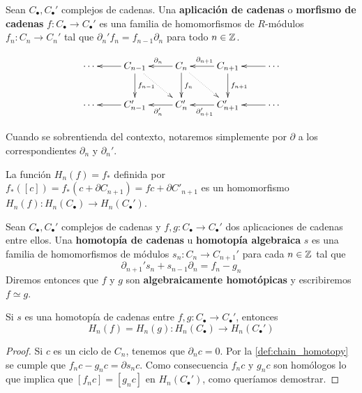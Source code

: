 \begin{definicion}
	Sean \(C_{\bullet},C_{\bullet}'\) complejos de cadenas. Una \textbf{aplicación
	de cadenas} o \textbf{morfismo de cadenas}
	\(f: C_{\bullet}\rightarrow C_{\bullet}'\) es una familia de homomorfismos de
	\(R\)-módulos \(f_{n}: C_{n} \rightarrow C_{n}'\) tal que
	\(\partial_{n}'f_{n} = f_{n-1}\partial_{n}\) para todo \(n \in \mathbb{Z}\).
\end{definicion}

\begin{equation}
	\label{chaincomplex}\xymatrix{ \cdots & C_{n-1} \ar[l] \ar[d]^{f_{n-1}} \ar@{..>}[dr] & C_n \ar[l]_{\partial_{n}} \ar[d]^{f_n} \ar@{..>}[dr] & C_{n+1} \ar[l]_{\partial_{n+1}} \ar[d]^{f_{n+1}} & \cdots \ar[l] \\ \cdots & C'_{n-1} \ar[l] & C'_n \ar[l]^{\partial'_{n}} & C'_{n+1} \ar[l]^{\partial'_{n+1}} & \cdots \ar[l] }
\end{equation}

Cuando se sobrentienda del contexto, notaremos simplemente por \(\partial\) a los
correspondientes \(\partial_{n}\) y \(\partial_{n}'\).

La función \(H_{n}(f) = f_{*}\) definida por
\(f_{*}([c]) = f_{*}(c + \partial C_{n+1}) = fc + \partial C'_{n+1}\) es un
homomorfismo \(H_{n}(f): H_{n}(C_{\bullet}) \rightarrow H_{n}(C_{\bullet}')\).%

\begin{definicion}
	\label{def:chain_homotopy} Sean \(C_{\bullet},C_{\bullet}'\) complejos de cadenas
	y \(f,g: C_{\bullet}\rightarrow C_{\bullet}'\) dos aplicaciones de cadenas entre
	ellos. Una \textbf{homotopía de cadenas} u \textbf{homotopía algebraica} \(s\)
	es una familia de homomorfismos de módulos \(s_{n}: C_{n} \rightarrow C_{n+1}'\)
	para cada \(n \in \mathbb{Z}\) tal que
	\begin{equation}
		\partial_{n+1}'s_{n} + s_{n-1}\partial_{n} = f_{n} - g_{n}
	\end{equation}
	Diremos entonces que \(f\) y \(g\) son \textbf{algebraicamente homotópicas} y escribiremos
	\(f \simeq g\).
\end{definicion}

\begin{teorema}
	\label{teo:homot-cad-misma-homologia} Si \(s\) es una homotopía de cadenas entre
	\(f,g: C_{\bullet}\rightarrow C_{\bullet}'\), entonces
	\[
		H_{n}(f) = H_{n}(g) : H_{n}(C_{\bullet}) \rightarrow H_{n}(C_{\bullet}')
	\]
\end{teorema}
\begin{proof}
	Si \(c\) es un ciclo de \(C_{n}\), tenemos que \(\partial_{n} c = 0\). Por la \autoref{def:chain_homotopy}
	se cumple que \(f_{n}c-g_{n}c = \partial s_{n} c\). Como consecuencia \(f_{n} c\)
	y \(g_{n} c\) son homólogos lo que implica que \([f_{n} c] = [g_{n} c]\) en
	\(H_{n}(C_{\bullet}')\), como queríamos demostrar.
\end{proof}

